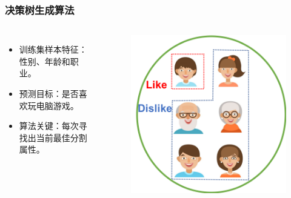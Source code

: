 \documentclass[10pt,aspectratio=43,mathserif]{beamer}
\begin{document}
        \begin{frame}
            \frametitle{\textbf{决策树生成算法}}
            \begin{columns}
                \footnotesize
                \begin{itemize}
                    \item 训练集样本特征：性别、年龄和职业。
                    \item 预测目标：是否喜欢玩电脑游戏。
                    \item 算法关键：每次寻找出当前最佳分割属性。
                \end{itemize}

                \begin{figure}[!t]
                    \centering
                    \includegraphics[width=1\textwidth]{figures/dt_gen_0.png}
                \end{figure}
            \end{columns}
        \end{frame}
\end{document}
